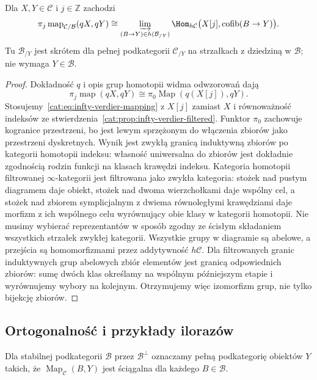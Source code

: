\begin{wniosek}\label{cat:cor:infty-verdier-mapping-groups}
Dla $X,Y\in\mathcal C$ i $j\in\mathbb Z$ zachodzi
\[
 \pi_j\operatorname{map}_{\mathcal C/\mathcal B}(qX,qY)
 \cong
 \varinjlim_{(B\to Y)\in h(\mathcal B_{/Y})}
 \Hom_{h\mathcal C}\bigl(X[j],\operatorname{cofib}(B\to Y)\bigr).
\]
Tu $\mathcal B_{/Y}$ jest skrótem dla pełnej podkategorii $\mathcal C_{/Y}$ na strzałkach z dziedziną w $\mathcal B$; nie wymaga $Y\in\mathcal B$.
\end{wniosek}
\begin{proof}
Dokładność $q$ i opis grup homotopii widma odwzorowań dają
\[
 \pi_j\operatorname{map}(qX,qY)
 \cong \pi_0\operatorname{Map}(q(X[j]),qY).
\]
Stosujemy~\eqref{cat:eq:infty-verdier-mapping} z $X[j]$ zamiast $X$ i równoważność indeksów ze stwierdzenia~\ref{cat:prop:infty-verdier-filtered}. Funktor $\pi_0$ zachowuje kogranice przestrzeni, bo jest lewym sprzężonym do włączenia zbiorów jako przestrzeni dyskretnych. Wynik jest zwykłą granicą induktywną zbiorów po kategorii homotopii indeksu: własność uniwersalna do zbiorów jest dokładnie zgodnością rodzin funkcji na klasach krawędzi indeksu. Kategoria homotopii filtrowanej $\infty$-kategorii jest filtrowana jako zwykła kategoria: stożek nad pustym diagramem daje obiekt, stożek nad dwoma wierzchołkami daje wspólny cel, a stożek nad zbiorem symplicjalnym z dwiema równoległymi krawędziami daje morfizm z ich wspólnego celu wyrównujący obie klasy w kategorii homotopii. Nie musimy wybierać reprezentantów w sposób zgodny ze ścisłym składaniem wszystkich strzałek zwykłej kategorii. Wszystkie grupy w diagramie są abelowe, a przejścia są homomorfizmami przez addytywność $h\mathcal C$. Dla filtrowanych granic induktywnych grup abelowych zbiór elementów jest granicą odpowiednich zbiorów: sumę dwóch klas określamy na wspólnym późniejszym etapie i wyrównujemy wybory na kolejnym. Otrzymujemy więc izomorfizm grup, nie tylko bijekcję zbiorów.
\end{proof}

\subsection{Ortogonalność i przykłady ilorazów}

\begin{definicja}\label{cat:def:infty-verdier-orthogonal}
Dla stabilnej podkategorii $\mathcal B$ przez $\mathcal B^\perp$ oznaczamy pełną podkategorię obiektów $Y$ takich, że $\operatorname{Map}_{\mathcal C}(B,Y)$ jest ściągalna dla każdego $B\in\mathcal B$.
\end{definicja}

